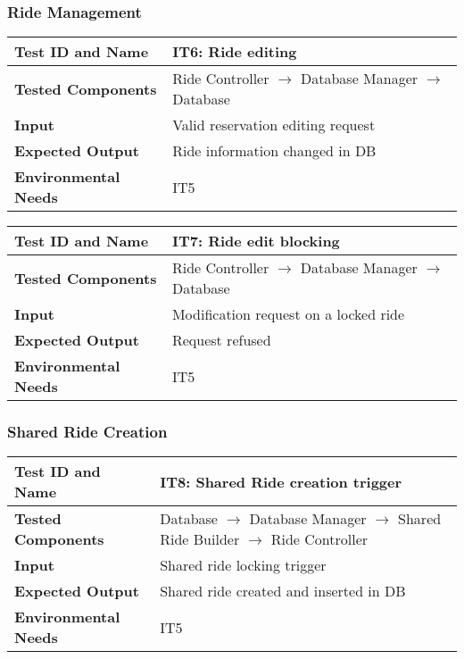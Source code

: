 \subsubsection{Ride Management}

\begin{tabular}{l p{}}
    \hline
    \textbf{Test ID and Name} & \textbf{IT6: Ride editing}\\
    \hline
    \textbf{Tested Components} & Ride Controller $\rightarrow$ Database Manager $\rightarrow$ Database\\
    \hline
    \textbf{Input} & Valid reservation editing request\\
    \hline
    \textbf{Expected Output} & Ride information changed in DB\\
    \hline
    \textbf{Environmental Needs} & IT5\\
    \hline
\end{tabular}

\vspace{2em}

\noindent\begin{tabular}{l p{}}
    \hline
    \textbf{Test ID and Name} & \textbf{IT7: Ride edit blocking}\\
    \hline
    \textbf{Tested Components} & Ride Controller $\rightarrow$ Database Manager $\rightarrow$ Database\\
    \hline
    \textbf{Input} & Modification request on a locked ride\\
    \hline
    \textbf{Expected Output} & Request refused\\
    \hline
    \textbf{Environmental Needs} & IT5\\
    \hline
\end{tabular}

\newpage

\subsubsection{Shared Ride Creation}

\begin{tabular}{l p{}}
    \hline
    \textbf{Test ID and Name} & \textbf{IT8: Shared Ride creation trigger}\\
    \hline
    \textbf{Tested Components} & Database $\rightarrow$ Database Manager $\rightarrow$ Shared Ride Builder $\rightarrow$ Ride Controller\\
    \hline
    \textbf{Input} & Shared ride locking trigger\\
    \hline
    \textbf{Expected Output} & Shared ride created and inserted in DB\\
    \hline
    \textbf{Environmental Needs} & IT5\\
    \hline
\end{tabular}

